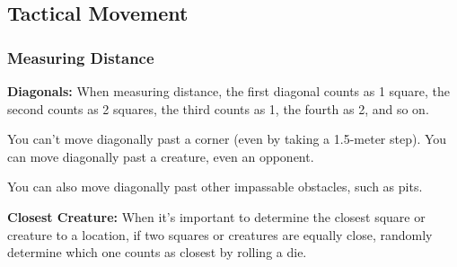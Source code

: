 \subsection{Tactical Movement}



\subsubsection{Measuring Distance}
\textbf{Diagonals:} When measuring distance, the first diagonal counts as 1 square, the second counts as 2 squares, the third counts as 1, the fourth as 2, and so on.

You can't move diagonally past a corner (even by taking a 1.5-meter step). You can move diagonally past a creature, even an opponent.

You can also move diagonally past other impassable obstacles, such as pits.

\textbf{Closest Creature:} When it's important to determine the closest square or creature to a location, if two squares or creatures are equally close, randomly determine which one counts as closest by rolling a die.



